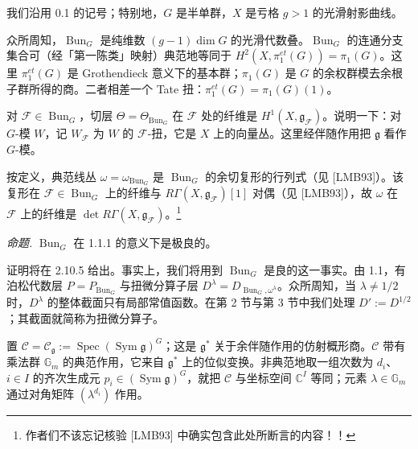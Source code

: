 

我们沿用 0.1 的记号；特别地，$G$ 是半单群，$X$ 是亏格 $g>1$ 的光滑射影曲线。

 众所周知，$\operatorname{Bun}_G$ 是纯维数 $(g-1)\dim G$ 的光滑代数叠。$\operatorname{Bun}_G$ 的连通分支集合可（经「第一陈类」映射）典范地等同于 $H^{2}(X,\pi_{1}^{et}(G))=\pi_{1}(G)$。这里 $\pi_{1}^{et}(G)$ 是 Grothendieck 意义下的基本群；$\pi_{1}(G)$ 是 $G$ 的余权群模去余根子群所得的商。二者相差一个 Tate 扭：$\pi_{1}^{et}(G)=\pi_{1}(G)(1)$。

对 $\mathcal{F}\in\operatorname{Bun}_G$，切层 $\Theta=\Theta_{\operatorname{Bun}_G}$ 在 $\mathcal{F}$ 处的纤维是 $H^{1}(X,\mathfrak{g}_{\mathcal{F}})$。说明一下：对 $G$-模 $W$，记 $W_{\mathcal{F}}$ 为 $W$ 的 $\mathcal{F}$-扭，它是 $X$ 上的向量丛。这里经伴随作用把 $\mathfrak{g}$ 看作 $G$-模。

按定义，典范线丛 $\omega=\omega_{\operatorname{Bun}_G}$ 是 $\operatorname{Bun}_G$ 的余切复形的行列式（见 [LMB93]）。该复形在 $\mathcal{F}\in\operatorname{Bun}_G$ 上的纤维与 $R\Gamma(X,\mathfrak{g}_{\mathcal{F}})[1]$ 对偶（见 [LMB93]），故 $\omega$ 在 $\mathcal{F}$ 上的纤维是 $\det R\Gamma(X,\mathfrak{g}_{\mathcal{F}})$。\footnote{作者们不该忘记核验 [LMB93] 中确实包含此处所断言的内容！！}

 \emph{命题.} $\operatorname{Bun}_G$ 在 1.1.1 的意义下是极良的。

证明将在 2.10.5 给出。事实上，我们将用到 $\operatorname{Bun}_G$ 是良的这一事实。由 1.1，有泊松代数层 $P=P_{\operatorname{Bun}_G}$ 与扭微分算子层 $D^{\lambda}=D_{\operatorname{Bun}_G,\omega^{\lambda}}$。众所周知，当 $\lambda\neq 1/2$ 时，$D^{\lambda}$ 的整体截面只有局部常值函数。在第 2 节与第 3 节中我们处理 $D':=D^{1/2}$；其截面就简称为扭微分算子。



 置 $\mathcal{C}=\mathcal{C}_{\mathfrak{g}}:=\operatorname{Spec}(\operatorname{Sym}\mathfrak{g})^{G}$；这是 $\mathfrak{g}^{*}$ 关于余伴随作用的仿射概形商。$\mathcal{C}$ 带有乘法群 $\mathbb{G}_m$ 的典范作用，它来自 $\mathfrak{g}^{*}$ 上的位似变换。非典范地取一组次数为 $d_i$、$i\in I$ 的齐次生成元 $p_i\in(\operatorname{Sym}\mathfrak{g})^{G}$，就把 $\mathcal{C}$ 与坐标空间 $\mathbb{C}^{I}$ 等同；元素 $\lambda\in\mathbb{G}_m$ 通过对角矩阵 $(\lambda^{d_i})$ 作用。

